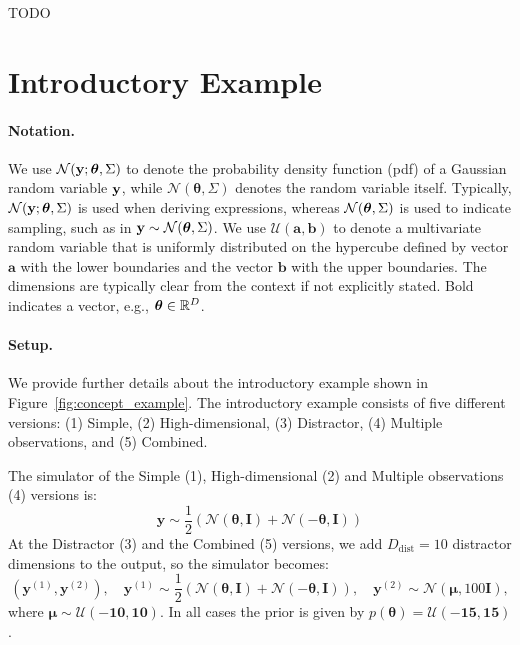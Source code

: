 TODO

\section{Introductory Example}
\label{app-sec:intro-example}

\paragraph{Notation.}

We use $\mathcal{N}(\mathbf{y}; \boldsymbol{\theta}, \Sigma)$ to denote the probability density function (pdf) of a Gaussian random variable $\mathbf{y}$, while $\mathcal{N}(\boldsymbol{\theta}, \Sigma)$ denotes the random variable itself. Typically, $\mathcal{N}(\mathbf{y}; \boldsymbol{\theta}, \Sigma)$ is used when deriving expressions, whereas $\mathcal{N}(\boldsymbol{\theta}, \Sigma)$ is used to indicate sampling, such as in $\mathbf{y} \sim \mathcal{N}(\boldsymbol{\theta}, \Sigma)$. We use $\mathcal{U}(\mathbf{a}, \mathbf{b})$ to denote a multivariate random variable that is uniformly distributed on the hypercube defined by vector $\mathbf{a}$ with the lower boundaries and the vector $\mathbf{b}$ with the upper boundaries. The dimensions are typically clear from the context if not explicitly stated. Bold indicates a vector, e.g., $\boldsymbol{\theta} \in \mathbb{R}^D$.

\paragraph{Setup.}

We provide further details about the introductory example shown in Figure~\ref{fig:concept_example}.
The introductory example consists of five different versions:
(1) Simple,
(2) High-dimensional,
(3) Distractor,
(4) Multiple observations, and
(5) Combined.

The simulator of the Simple (1), High-dimensional (2) and Multiple observations (4) versions is:
\begin{equation}
  \label{eq:intro-simulator}
  \mathbf{y} \sim \frac{1}{2} \left( \mathcal{N}(\boldsymbol{\theta}, \mathbf{I}) + \mathcal{N}(-\boldsymbol{\theta}, \mathbf{I}) \right)
\end{equation}
%
At the Distractor (3) and the Combined (5) versions, we add $D_{\text{dist}} = 10$ distractor dimensions to the output, so the simulator becomes:
\begin{equation}
  \label{eq:intro-simulator-distractor}
  (\mathbf{y}^{(1)}, \mathbf{y}^{(2)}), \quad \mathbf{y}^{(1)} \sim \frac{1}{2} \left( \mathcal{N}(\boldsymbol{\theta}, \mathbf{I}) + \mathcal{N}(-\boldsymbol{\theta}, \mathbf{I}) \right), \quad \mathbf{y}^{(2)} \sim \mathcal{N}(\boldsymbol{\mu}, 100 \mathbf{I}),
\end{equation}
%
where $\boldsymbol{\mu} \sim \mathcal{U}(-\mathbf{10}, \mathbf{10})$.
In all cases the prior is given by \(p(\boldsymbol{\theta}) = \mathcal{U}(\mathbf{-15}, \mathbf{15}) \).


